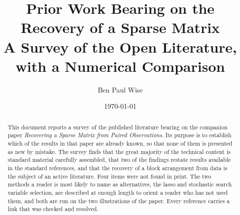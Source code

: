 %




\renewcommand{\thesection}{\arabic{section}}

\def\myversion{v01a}

\lfoot{\color{myDarkRed}\bf{DRAFT \myversion}}



\begin{titlepage}
\title{Prior Work Bearing on the Recovery of a Sparse Matrix\\
       A Survey of the Open Literature, with a Numerical Comparison}
\author{Ben Paul Wise}
\date{\today}

\maketitle

\begin{abstract}
This document reports a survey of the published literature bearing on the
companion paper \emph{Recovering a Sparse Matrix from Paired Observations}. Its
purpose is to establish which of the results in that paper are already known, so
that none of them is presented as new by mistake. The survey finds that the great
majority of the technical content is standard material carefully assembled, that
two of the findings restate results available in the standard references, and that
the recovery of a block arrangement from data is the subject of an active
literature. Four items were not found in print. The two methods a reader is most
likely to name as alternatives, the lasso and stochastic search variable selection,
are described at enough length to orient a reader who has not used them, and both
are run on the two illustrations of the paper. Every reference carries a link that
was checked and resolved.
\end{abstract}

\end{titlepage}

